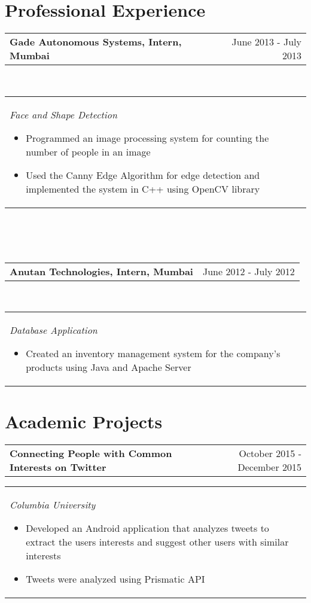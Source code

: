 \documentclass[margin,line]{res}
\begin{document}
\begin{resume}
\section{\sc \bf Professional Experience}
\begin{tabular}{p{4.41in}  r}
\bf Gade Autonomous Systems, Intern, Mumbai  & June 2013 - July 2013
\end{tabular}
\\
\begin{tabular}{p{5.92in}}
\it Face and Shape Detection
\begin{itemize}
    \item \textup {Programmed an image processing system for counting the number of people in an image}
    \item \textup {Used the Canny Edge Algorithm for edge detection and implemented the system in C++ using OpenCV library}
\end{itemize}
\end{tabular}
\\\\\\
\begin{tabular}{p{4.4in}  r}
\bf Anutan Technologies, Intern, Mumbai & June 2012 - July 2012
\end{tabular}
\\
\begin{tabular}{p{5.92in}}
\it Database Application
\begin{itemize}
    \item \textup{Created an inventory management system for the company's products using Java and Apache Server}
\end{itemize}
\end{tabular}



\section{\sc \bf Academic Projects}

\begin{tabular}{p{3.875in} r}
\bf Connecting People with Common Interests on Twitter & October 2015 - December 2015
\end{tabular}
\begin{tabular} {p{5.92in}}
\it Columbia University 
\begin{itemize}
    \item \textup{Developed an Android application that analyzes tweets to extract the users interests and suggest other users with similar interests}
    \item \textup{Tweets were analyzed using Prismatic API}
\end{itemize}
\end{tabular}


\end{resume}
\end{document}
